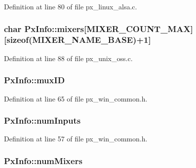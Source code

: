 Definition at line 80 of file px\+\_\+linux\+\_\+alsa.\+c.

\subsubsection[{\texorpdfstring{mixers}{mixers}}]{\setlength{\rightskip}{0pt plus 5cm}char Px\+Info\+::mixers\mbox{[}{\bf M\+I\+X\+E\+R\+\_\+\+C\+O\+U\+N\+T\+\_\+\+M\+AX}\mbox{]}\mbox{[}sizeof({\bf M\+I\+X\+E\+R\+\_\+\+N\+A\+M\+E\+\_\+\+B\+A\+SE})+1\mbox{]}}\hypertarget{struct_px_info_ae41c32a96f28eb8043d869a52870d939}{}\label{struct_px_info_ae41c32a96f28eb8043d869a52870d939}


Definition at line 88 of file px\+\_\+unix\+\_\+oss.\+c.

\subsubsection[{\texorpdfstring{mux\+ID}{muxID}}]{ Px\+Info\+::mux\+ID}\hypertarget{struct_px_info_ae33ef31cff4c7e4f4428f850d1cf0bc2}{}\label{struct_px_info_ae33ef31cff4c7e4f4428f850d1cf0bc2}


Definition at line 65 of file px\+\_\+win\+\_\+common.\+h.

\subsubsection[{\texorpdfstring{num\+Inputs}{numInputs}}]{ Px\+Info\+::num\+Inputs}\hypertarget{struct_px_info_ae2d763c37708bc55bfa4a17ebf3d86cb}{}\label{struct_px_info_ae2d763c37708bc55bfa4a17ebf3d86cb}


Definition at line 57 of file px\+\_\+win\+\_\+common.\+h.

\subsubsection[{\texorpdfstring{num\+Mixers}{numMixers}}]{ Px\+Info\+::num\+Mixers}\hypertarget{struct_px_info_a557a6daaf51ce5c34a4af36d4c67eeba}{}\label{struct_px_info_a557a6daaf51ce5c34a4af36d4c67eeba}



